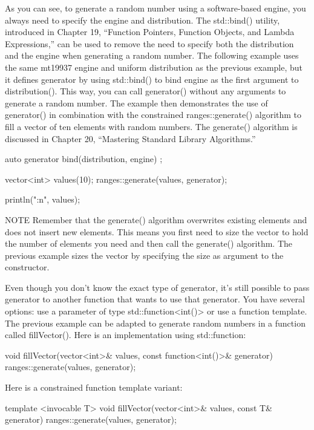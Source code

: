 As you can see, to generate a random number using a software-based engine, you always need to specify the engine and distribution. The std::bind() utility, introduced in Chapter 19, “Function Pointers, Function Objects, and Lambda Expressions,” can be used to remove the need to specify both the distribution and the engine when generating a random number. The following example uses the same mt19937 engine and uniform distribution as the previous example, but it defines generator by using std::bind() to bind engine as the first argument to distribution(). This way, you can call generator() without any arguments to generate a random number. The example then demonstrates the use of generator() in combination with the constrained ranges::generate() algorithm to fill a vector of ten elements with random numbers. The generate() algorithm is discussed in Chapter 20, “Mastering Standard Library Algorithms.”

\begin{cpp}
auto generator { bind(distribution, engine) };

vector<int> values(10);
ranges::generate(values, generator);

println("{:n}", values);
\end{cpp}

\begin{myNotic}{NOTE}
Remember that the generate() algorithm overwrites existing elements and does not insert new elements. This means you first need to size the vector to hold the number of elements you need and then call the generate() algorithm. The previous example sizes the vector by specifying the size as argument to the constructor.
\end{myNotic}

Even though you don’t know the exact type of generator, it’s still possible to pass generator to another function that wants to use that generator. You have several options: use a parameter of type std::function<int()> or use a function template. The previous example can be adapted to generate random numbers in a function called fillVector(). Here is an implementation using std::function:

\begin{cpp}
void fillVector(vector<int>& values, const function<int()>& generator)
{
    ranges::generate(values, generator);
}
\end{cpp}

Here is a constrained function template variant:

\begin{cpp}
template <invocable T>
void fillVector(vector<int>& values, const T& generator)
{
    ranges::generate(values, generator);
}
\end{cpp}

